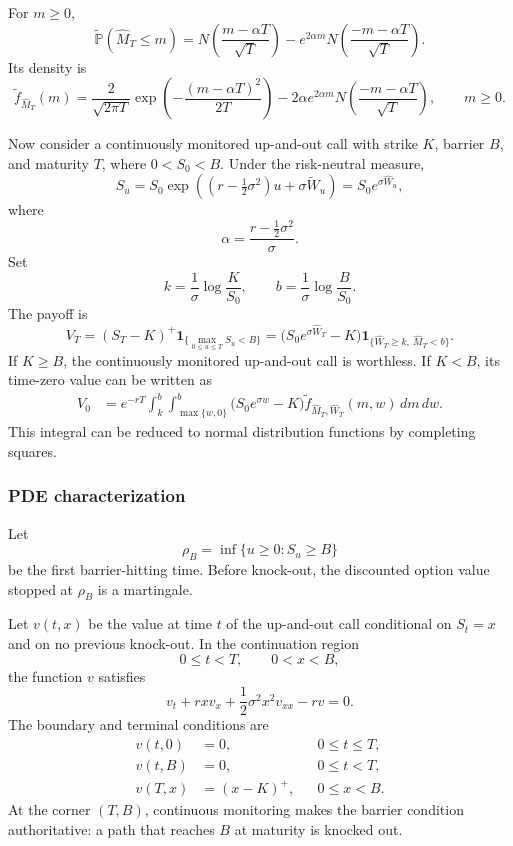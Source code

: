 \begin{cor}
For $m\geq0$,
\[
\widetilde{\mathbb{P}}(\widehat M_T\leq m)
=N\!\left(\frac{m-\alpha T}{\sqrt T}\right)
-e^{2\alpha m}
 N\!\left(\frac{-m-\alpha T}{\sqrt T}\right).
\]
Its density is
\[
\widetilde f_{\widehat M_T}(m)
=\frac{2}{\sqrt{2\pi T}}
 \exp\!\left(-\frac{(m-\alpha T)^2}{2T}\right)
-2\alpha e^{2\alpha m}
 N\!\left(\frac{-m-\alpha T}{\sqrt T}\right),
\qquad m\geq0.
\]
\end{cor}

Now consider a continuously monitored up-and-out call with strike $K$, barrier $B$, and maturity $T$, where $0<S_0<B$. Under the risk-neutral measure,
\[
S_u
=S_0\exp\!\left(
(r-\tfrac12\sigma^2)u+\sigma\widetilde W_u
\right)
=S_0e^{\sigma\widehat W_u},
\]
where
\[
\alpha=\frac{r-\frac12\sigma^2}{\sigma}.
\]
Set
\[
k=\frac{1}{\sigma}\log\frac{K}{S_0},
\qquad
b=\frac{1}{\sigma}\log\frac{B}{S_0}.
\]
The payoff is
\[
V_T=(S_T-K)^+
\mathbf{1}_{\{\max_{0\leq u\leq T}S_u<B\}}
=\bigl(S_0e^{\sigma\widehat W_T}-K\bigr)
 \mathbf{1}_{\{\widehat W_T\geq k,\ \widehat M_T<b\}}.
\]
If $K\geq B$, the continuously monitored up-and-out call is worthless. If $K<B$, its time-zero value can be written as
\[
\begin{aligned}
V_0
&=e^{-rT}
 \int_k^b\int_{\max\{w,0\}}^b
 \bigl(S_0e^{\sigma w}-K\bigr)
 \widetilde f_{\widehat M_T,\widehat W_T}(m,w)
 \,dm\,dw.
\end{aligned}
\]
This integral can be reduced to normal distribution functions by completing squares.

\subsubsection*{PDE characterization}

Let
\[
\rho_B=\inf\{u\geq0:S_u\geq B\}
\]
be the first barrier-hitting time. Before knock-out, the discounted option value stopped at $\rho_B$ is a martingale.

\begin{thm}
Let $v(t,x)$ be the value at time $t$ of the up-and-out call conditional on $S_t=x$ and on no previous knock-out. In the continuation region
\[
0\leq t<T,
\qquad 0<x<B,
\]
the function $v$ satisfies
\[
v_t+rxv_x+\frac12\sigma^2x^2v_{xx}-rv=0.
\]
The boundary and terminal conditions are
\[
\begin{aligned}
v(t,0)&=0, &&0\leq t\leq T,\\
v(t,B)&=0, &&0\leq t<T,\\
v(T,x)&=(x-K)^+, &&0\leq x<B.
\end{aligned}
\]
At the corner $(T,B)$, continuous monitoring makes the barrier condition authoritative: a path that reaches $B$ at maturity is knocked out.
\end{thm}

